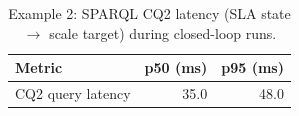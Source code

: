 \begin{table}[htbp]
\centering
\caption{Example 2: SPARQL CQ2 latency (SLA state $\rightarrow$ scale target) during closed-loop runs.}
\label{tab:paper_e2_sparql}
\begin{tabular}{lrr}
\toprule
\textbf{Metric} & \textbf{p50 (ms)} & \textbf{p95 (ms)} \\
\midrule
CQ2 query latency & 35.0 & 48.0 \\
\bottomrule
\end{tabular}
\end{table}
